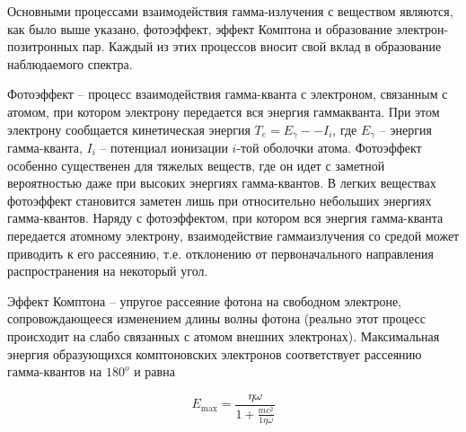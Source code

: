 Основными процессами взаимодействия гамма-излучения с веществом являются, как
было выше указано, фотоэффект, эффект Комптона и образование
электрон-позитронных пар. Каждый из этих процессов вносит свой вклад в
образование наблюдаемого спектра.

Фотоэффект -- процесс взаимодействия гамма-кванта с электроном, связанным с
атомом, при котором электрону передается вся энергия гаммакванта. При этом
электрону сообщается кинетическая энергия $T_e = E_{\gamma} -- I_i$, где
$E_{\gamma}$ -- энергия гамма-кванта, $I_i$ -- потенциал ионизации $i$-той
оболочки атома. Фотоэффект особенно существенен для тяжелых веществ, где он идет
с заметной вероятностью даже при высоких энергиях гамма-квантов. В легких
веществах фотоэффект становится заметен лишь при относительно небольших энергиях
гамма-квантов. Наряду с фотоэффектом, при котором вся энергия гамма-кванта
передается атомному электрону, взаимодействие гаммаизлучения со средой может
приводить к его рассеянию, т.е. отклонению от первоначального направления
распространения на некоторый угол.

Эффект Комптона -- упругое рассеяние фотона на свободном электроне,
сопровождающееся изменением длины волны фотона (реально этот процесс происходит
на слабо связанных с атомом внешних электронах). Максимальная энергия
образующихся комптоновских электронов соответствует рассеянию гамма-квантов на
$180^o$ и равна

\begin{equation}
  E_{\max} = \frac{\eta \omega}{1 + \frac{m c^2}{1 \eta \omega}}
\end{equation}
